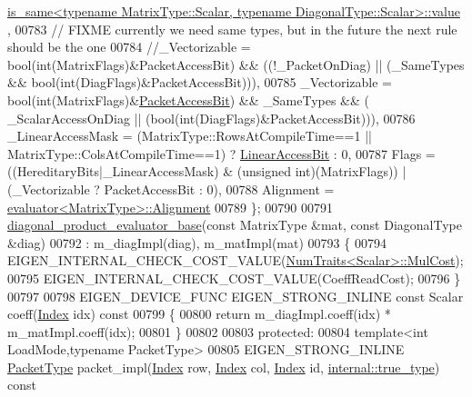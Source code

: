 \begin{DoxyCode}
      \hyperlink{struct_eigen_1_1internal_1_1is__same}{is\_same<typename MatrixType::Scalar, typename DiagonalType::Scalar>::value}
      ,
00783     \textcolor{comment}{// FIXME currently we need same types, but in the future the next rule should be the one}
00784     \textcolor{comment}{//\_Vectorizable = bool(int(MatrixFlags)&PacketAccessBit) && ((!\_PacketOnDiag) || (\_SameTypes &&
       bool(int(DiagFlags)&PacketAccessBit))),}
00785     \_Vectorizable = bool(\textcolor{keywordtype}{int}(MatrixFlags)&\hyperlink{group__flags_ga1a306a438e1ab074e8be59512e887b9f}{PacketAccessBit}) && \_SameTypes && (
      \_ScalarAccessOnDiag || (bool(\textcolor{keywordtype}{int}(DiagFlags)&PacketAccessBit))),
00786     \_LinearAccessMask = (MatrixType::RowsAtCompileTime==1 || MatrixType::ColsAtCompileTime==1) ? 
      \hyperlink{group__flags_ga4b983a15d57cd55806df618ac544d09e}{LinearAccessBit} : 0,
00787     Flags = ((HereditaryBits|\_LinearAccessMask) & (\textcolor{keywordtype}{unsigned} int)(MatrixFlags)) | (\_Vectorizable ? 
      PacketAccessBit : 0),
00788     Alignment = \hyperlink{struct_eigen_1_1internal_1_1evaluator}{evaluator<MatrixType>::Alignment}
00789   \};
00790   
00791   \hyperlink{struct_eigen_1_1internal_1_1diagonal__product__evaluator__base}{diagonal\_product\_evaluator\_base}(\textcolor{keyword}{const} MatrixType &mat, \textcolor{keyword}{const} DiagonalType 
      &diag)
00792     : m\_diagImpl(diag), m\_matImpl(mat)
00793   \{
00794     EIGEN\_INTERNAL\_CHECK\_COST\_VALUE(\hyperlink{group___core___module_struct_eigen_1_1_num_traits}{NumTraits<Scalar>::MulCost});
00795     EIGEN\_INTERNAL\_CHECK\_COST\_VALUE(CoeffReadCost);
00796   \}
00797   
00798   EIGEN\_DEVICE\_FUNC EIGEN\_STRONG\_INLINE \textcolor{keyword}{const} Scalar coeff(\hyperlink{namespace_eigen_a62e77e0933482dafde8fe197d9a2cfde}{Index} idx)\textcolor{keyword}{ const}
00799 \textcolor{keyword}{  }\{
00800     \textcolor{keywordflow}{return} m\_diagImpl.coeff(idx) * m\_matImpl.coeff(idx);
00801   \}
00802   
00803 \textcolor{keyword}{protected}:
00804   \textcolor{keyword}{template}<\textcolor{keywordtype}{int} LoadMode,\textcolor{keyword}{typename} PacketType>
00805   EIGEN\_STRONG\_INLINE \hyperlink{struct_eigen_1_1_packet_type}{PacketType} packet\_impl(\hyperlink{namespace_eigen_a62e77e0933482dafde8fe197d9a2cfde}{Index} row, \hyperlink{namespace_eigen_a62e77e0933482dafde8fe197d9a2cfde}{Index} col, 
      \hyperlink{namespace_eigen_a62e77e0933482dafde8fe197d9a2cfde}{Index} \textcolor{keywordtype}{id}, \hyperlink{struct_eigen_1_1internal_1_1true__type}{internal::true\_type})\textcolor{keyword}{ const}

\end{DoxyCode}
